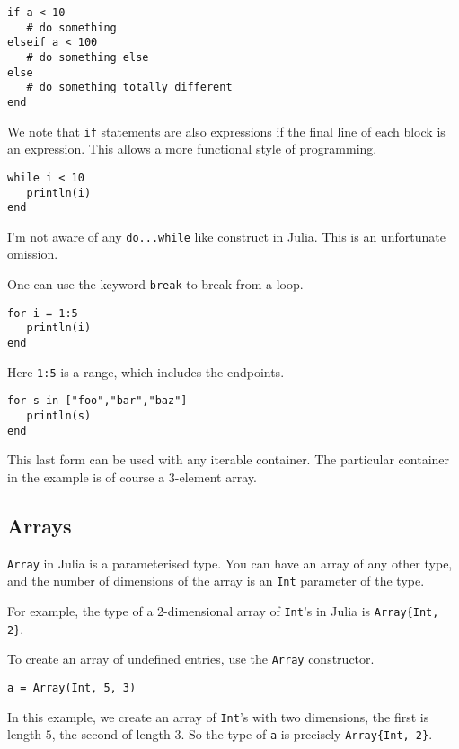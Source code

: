 \documentclass[a4paper,10pt]{article}
\newcommand{\code}{\lstinline}
\begin{document}
{{{{\begin{lstlisting}
if a < 10
   # do something
elseif a < 100
   # do something else
else
   # do something totally different
end
\end{lstlisting}

We note that \code{if} statements are also expressions if the final line of each block is an expression.
This allows a more functional style of programming.

\begin{lstlisting}
while i < 10
   println(i)
end
\end{lstlisting}

I'm not aware of any \code{do...while} like construct in Julia. This is an unfortunate omission.

One can use the keyword \code{break} to break from a loop.

\begin{lstlisting}
for i = 1:5
   println(i)
end
\end{lstlisting}

Here \code{1:5} is a range, which includes the endpoints.

\begin{lstlisting}
for s in ["foo","bar","baz"]
   println(s)
end
\end{lstlisting}

This last form can be used with any iterable container. The particular container in the example is
of course a 3-element array.

\subsection{Arrays}

\code{Array} in Julia is a parameterised type. You can have an array of any other type, and the 
number of dimensions of the array is an \code{Int} parameter of the type.

For example, the type of a 2-dimensional array of \code{Int}'s in Julia is \code|Array{Int, 2}|.

To create an array of undefined entries, use the \code{Array} constructor.

\begin{lstlisting}
a = Array(Int, 5, 3)
\end{lstlisting}

In this example, we create an array of \code{Int}'s with two dimensions, the first is length $5$,
the second of length $3$. So the type of \code{a} is precisely \code|Array{Int, 2}|.

}}}}
\end{document}
